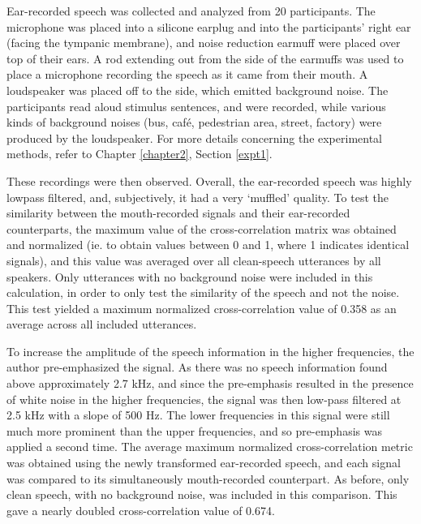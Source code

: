 Ear-recorded speech was collected and analyzed from 20 participants.  The microphone was placed into a silicone earplug and into the participants' right ear (facing the tympanic membrane), and noise reduction earmuff were placed over top of their ears.  A rod extending out from the side of the earmuffs was used to place a microphone recording the speech as it came from their mouth.  A loudspeaker was placed off to the side, which emitted background noise.  The participants read aloud stimulus sentences, and were recorded, while various kinds of background noises (bus, caf\'{e}, pedestrian area, street, factory) were produced by the loudspeaker.  For more details concerning the experimental methods, refer to Chapter \ref{chapter2}, Section \ref{expt1}.

These recordings were then observed.  Overall, the ear-recorded speech was highly lowpass filtered, and, subjectively, it had a very `muffled' quality.  To test the similarity between the mouth-recorded signals and their ear-recorded counterparts, the maximum value of the cross-correlation matrix was obtained and normalized (ie. to obtain values between 0 and 1, where 1 indicates identical signals), and this value was averaged over all clean-speech utterances by all speakers.  Only utterances with no background noise were included in this calculation, in order to only test the similarity of the speech and not the noise.  This test yielded a maximum normalized cross-correlation value of 0.358 as an average across all included utterances.

To increase the amplitude of the speech information in the higher frequencies, the author pre-emphasized the signal.  As there was no speech information found above approximately 2.7 kHz, and since the pre-emphasis resulted in the presence of white noise in the higher frequencies, the signal was then low-pass filtered at 2.5 kHz with a slope of 500 Hz.  The lower frequencies in this signal were still much more prominent than the upper frequencies, and so pre-emphasis was applied a second time.  The average maximum normalized cross-correlation metric was obtained using the newly transformed ear-recorded speech, and each signal was compared to its simultaneously mouth-recorded counterpart.  As before, only clean speech, with no background noise, was included in this comparison.  This gave a nearly doubled cross-correlation value of 0.674.


